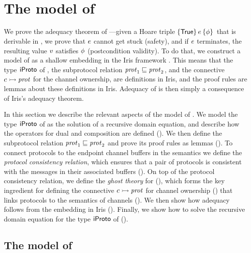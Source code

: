 \section{The model of \lname}
\label{sec:model}

\newcommand{\chanmapsto}[4]{\interp {(#1,#2)} {(#3, #4)}}
\newcommand{\protevalname}{\mathsf{prot\_consistent}}
\newcommand{\proteval}[4]{\protevalname\ #1\ #2\ #3\ #4}

We prove the adequacy theorem of \lname---given a Hoare triple $\hoare \TRUE \expr \pprop$
that is derivable in \lname, we prove that $e$ cannot get stuck (\ie safety), and if
$e$ terminates, the resulting value $v$ satisfies $\phi$ (\ie postcondition
validity).
To do that, we construct a model of \lname as a shallow embedding in
the Iris framework \cite{jung-POPL2015,krebbers-ESOP2017,jung-ICFP06,jung-JFP2018}.
This means that the type $\mathsf{iProto}$ of \pname,
the subprotocol relation $\mathit{prot}_1 \sqsubseteq \mathit{prot}_2$,
and the connective $c \rightarrowtail \mathit{prot}$ for the channel ownership,
are definitions in Iris,
and the \lname proof rules are lemmas about these definitions in Iris.
Adequacy of \lname is then simply a consequence of Iris's adequacy theorem.

In this section we describe the relevant aspects of the model of \lname.
We model the type $\mathsf{iProto}$ of \pname as the solution of a recursive domain equation, and
describe how the operators for dual and composition are defined
().
We then define the subprotocol relation $\mathit{prot}_1 \sqsubseteq \mathit{prot}_2$
and prove its proof rules as lemmas ().
To connect protocols to the endpoint channel buffers in the semantics
we define the \emph{protocol consistency relation},
which ensures that a pair of protocols is consistent with the messages in
their associated buffers ().
On top of the protocol consistency relation, we define the \emph{\lname ghost theory} for
\pname (),
which forms the key ingredient for defining the connective $c \rightarrowtail \mathit{prot}$ for
channel ownership () that links protocols to the
semantics of channels ().
We then show how adequacy follows from the embedding in Iris ().
Finally, we show how to solve the recursive domain equation for the type
$\mathsf{iProto}$ of \pname
().

\subsection{The model of \pname}
\label{sec:protocol_model}

